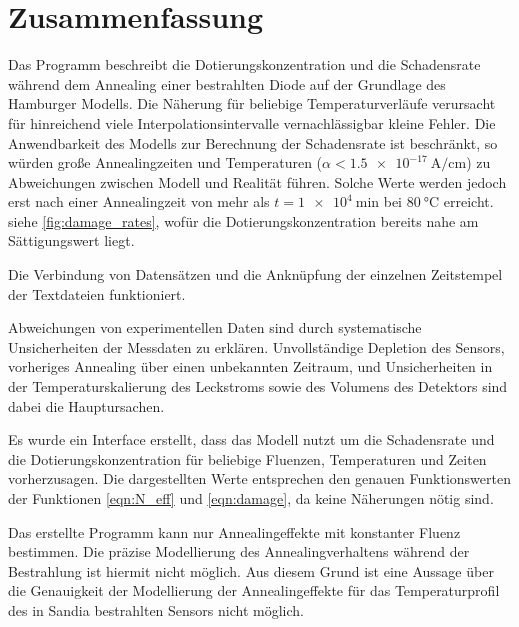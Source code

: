 \chapter{Zusammenfassung}
Das Programm beschreibt die Dotierungskonzentration und die Schadensrate während dem
Annealing einer bestrahlten Diode
auf der Grundlage des Hamburger Modells. Die Näherung für beliebige
Temperaturverläufe verursacht für hinreichend viele Interpolationsintervalle
vernachlässigbar kleine Fehler. Die Anwendbarkeit des Modells zur Berechnung der Schadensrate ist
beschränkt, so würden große Annealingzeiten und Temperaturen ($\alpha < \SI{1.5e-17}{\ampere\per\centi\meter}$) zu Abweichungen
zwischen Modell und Realität führen. Solche Werte werden jedoch erst nach
einer Annealingzeit von mehr als $t=\SI{1e4}{\minute}$ bei $\SI{80}{\celsius}$ erreicht. siehe
\ref{fig:damage_rates}, wofür
die Dotierungskonzentration bereits nahe am Sättigungswert liegt.

Die Verbindung von Datensätzen und die Anknüpfung der einzelnen Zeitstempel der
Textdateien funktioniert.

Abweichungen von experimentellen Daten sind durch systematische Unsicherheiten der Messdaten
zu erklären. Unvollständige Depletion des Sensors, vorheriges Annealing über einen
unbekannten Zeitraum, und Unsicherheiten in der Temperaturskalierung des Leckstroms sowie
des Volumens des Detektors sind dabei die Hauptursachen.

Es wurde ein Interface erstellt, dass das Modell nutzt um die Schadensrate und die Dotierungskonzentration
für beliebige Fluenzen, Temperaturen und
Zeiten vorherzusagen. Die dargestellten Werte entsprechen den genauen Funktionswerten
der Funktionen \ref{eqn:N_eff} und \ref{eqn:damage}, da keine Näherungen nötig sind.

Das erstellte Programm kann nur Annealingeffekte mit konstanter Fluenz bestimmen.
Die präzise Modellierung des Annealingverhaltens während der Bestrahlung ist
hiermit nicht möglich. Aus diesem Grund ist eine Aussage über die Genauigkeit der
Modellierung der Annealingeffekte für das Temperaturprofil des in Sandia bestrahlten Sensors nicht möglich.

